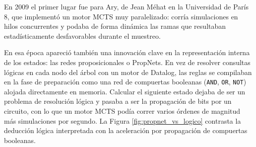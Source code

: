 En 2009 el primer lugar fue para Ary, de Jean Méhat en la Universidad de París 8, que implementó un motor MCTS muy paralelizado: corría simulaciones en hilos concurrentes y podaba de forma dinámica las ramas que resultaban estadísticamente desfavorables durante el muestreo.

En esa época apareció también una innovación clave en la representación interna de los estados: las redes proposicionales o PropNets. En vez de resolver consultas lógicas en cada nodo del árbol con un motor de Datalog, las reglas se compilaban en la fase de preparación como una red de compuertas booleanas (\texttt{AND}, \texttt{OR}, \texttt{NOT}) alojada directamente en memoria. Calcular el siguiente estado dejaba de ser un problema de resolución lógica y pasaba a ser la propagación de bits por un circuito, con lo que un motor MCTS podía correr varios órdenes de magnitud más simulaciones por segundo. La Figura \ref{fig:propnet_vs_logico} contrasta la deducción lógica interpretada con la aceleración por propagación de compuertas booleanas.

